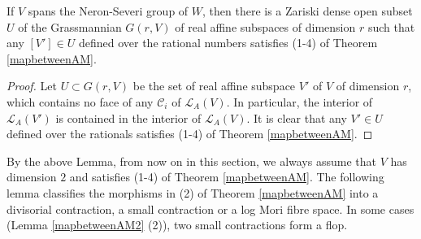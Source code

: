 \begin{lemma}\label{subspace}
  \cite[Corollary 3.4]{haconSarkisovProgram2012} If $V$ spans the Neron-Severi group of $W$, then there is a Zariski dense open subset $U$ of the Grassmannian $G(r, V)$ of real affine subspaces of dimension $r$ such that any  $[V']\in U$ defined over the rational numbers satisfies (1-4) of Theorem \ref{mapbetweenAM}.
\end{lemma}

\begin{proof}
  Let $U \subset G(r, V) $ be the set of real affine subspace  $V'$ of $V$ of dimension $r$, which contains no face of any $\mathcal{C}_{i}$ of $\mathcal{L}_A(V)$. In particular, the interior of  $\mathcal{L}_{A}(V')$ is contained in the interior of $\mathcal{L}_{A}(V)$. It is clear that any $V'\in U$ defined over the rationals satisfies (1-4) of Theorem \ref{mapbetweenAM}.
\end{proof}

By the above Lemma, from now on in this section, we always assume that $V$ has dimension $2$ and satisfies (1-4) of Theorem \ref{mapbetweenAM}. The following lemma classifies the morphisms in (2) of Theorem \ref{mapbetweenAM} into a divisorial contraction, a small contraction or a log Mori fibre space. In some cases (Lemma \ref{mapbetweenAM2} (2)), two small contractions form a flop.

